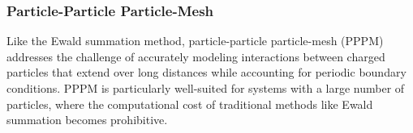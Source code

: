 \subsubsection{Particle-Particle Particle-Mesh}
Like the Ewald summation method, particle-particle particle-mesh (PPPM) addresses the challenge of accurately modeling interactions between charged particles that extend over long distances while accounting for periodic boundary conditions. PPPM is particularly well-suited for systems with a large number of particles, where the computational cost of traditional methods like Ewald summation becomes prohibitive.

%
%
%
%
%


